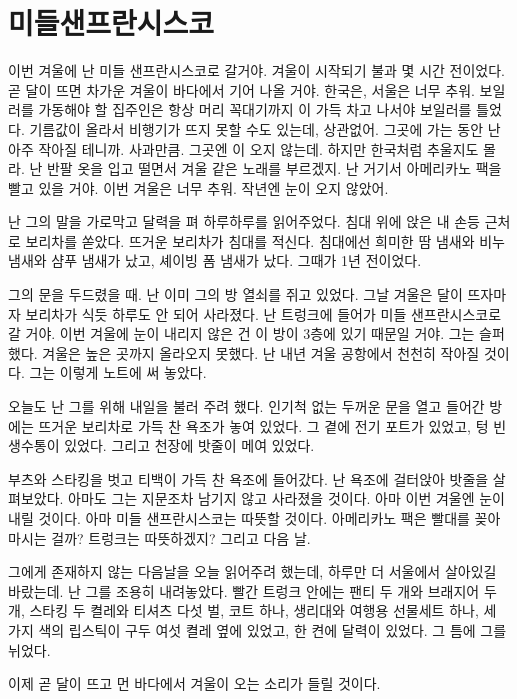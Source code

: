 \begin{article}
\hypertarget{uxbbf8uxb4e4uxc0ccuxd504uxb780uxc2dcuxc2a4uxcf54}{%
\chapter{미들샌프란시스코}\label{uxbbf8uxb4e4uxc0ccuxd504uxb780uxc2dcuxc2a4uxcf54}}

이번 겨울에 난 미들 샌프란시스코로 갈거야. 겨울이 시작되기 불과 몇 시간 전이었다. 곧 달이 뜨면 차가운 겨울이 바다에서 기어 나올 거야. 한국은, 서울은 너무 추워. 보일러를 가동해야 할 집주인은 항상 머리 꼭대기까지 이 가득 차고 나서야 보일러를 틀었다. 기름값이 올라서 비행기가 뜨지 못할 수도 있는데, 상관없어. 그곳에 가는 동안 난 아주 작아질 테니까. 사과만큼. 그곳엔 이 오지 않는데. 하지만 한국처럼 추울지도 몰라. 난 반팔 옷을 입고 떨면서 겨울 같은 노래를 부르겠지. 난 거기서 아메리카노 팩을 빨고 있을 거야. 이번 겨울은 너무 추워. 작년엔 눈이 오지 않았어.

난 그의 말을 가로막고 달력을 펴 하루하루를 읽어주었다. 침대 위에 앉은 내 손등 근처로 보리차를 쏟았다. 뜨거운 보리차가 침대를 적신다. 침대에선 희미한 땀 냄새와 비누 냄새와 샴푸 냄새가 났고, 셰이빙 폼 냄새가 났다. 그때가 1년 전이었다.

그의 문을 두드렸을 때. 난 이미 그의 방 열쇠를 쥐고 있었다. 그날 겨울은 달이 뜨자마자 보리차가 식듯 하루도 안 되어 사라졌다. 난 트렁크에 들어가 미들 샌프란시스코로 갈 거야. 이번 겨울에 눈이 내리지 않은 건 이 방이 3층에 있기 때문일 거야. 그는 슬퍼했다. 겨울은 높은 곳까지 올라오지 못했다. 난 내년 겨울 공항에서 천천히 작아질 것이다. 그는 이렇게 노트에 써 놓았다.

오늘도 난 그를 위해 내일을 불러 주려 했다. 인기척 없는 두꺼운 문을 열고 들어간 방에는 뜨거운 보리차로 가득 찬 욕조가 놓여 있었다. 그 곁에 전기 포트가 있었고, 텅 빈 생수통이 있었다. 그리고 천장에 밧줄이 메여 있었다.

부츠와 스타킹을 벗고 티백이 가득 찬 욕조에 들어갔다. 난 욕조에 걸터앉아 밧줄을 살펴보았다. 아마도 그는 지문조차 남기지 않고 사라졌을 것이다. 아마 이번 겨울엔 눈이 내릴 것이다. 아마 미들 샌프란시스코는 따뜻할 것이다. 아메리카노 팩은 빨대를 꽂아 마시는 걸까? 트렁크는 따뜻하겠지? 그리고 다음 날.

그에게 존재하지 않는 다음날을 오늘 읽어주려 했는데, 하루만 더 서울에서 살아있길 바랐는데. 난 그를 조용히 내려놓았다. 빨간 트렁크 안에는 팬티 두 개와 브래지어 두 개, 스타킹 두 켤레와 티셔츠 다섯 벌, 코트 하나, 생리대와 여행용 선물세트 하나, 세 가지 색의 립스틱이 구두 여섯 켤레 옆에 있었고, 한 켠에 달력이 있었다. 그 틈에 그를 뉘었다.

이제 곧 달이 뜨고 먼 바다에서 겨울이 오는 소리가 들릴 것이다.
\end{article}
